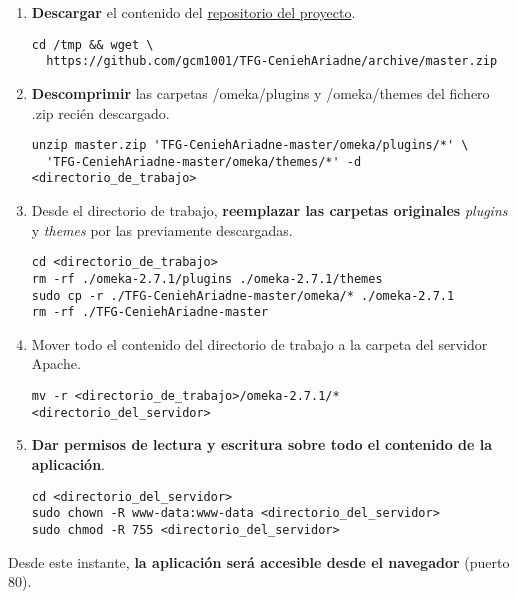 \begin{enumerate}
{  datos} (anotados en el paso 1).
\begin{verbatim}
cd <directorio_de_trabajo>/omeka-2.7.1
nano db.ini
\end{verbatim}
  No es necesario modificar los parámetros `prefix` o `port`.
\begin{verbatim}
[database]
host     = "localhost"
username = "usuario"
password = "contraseña"
dbname   = "omekadb"
prefix   = "omeka_"
charset  = "utf8"
;port     = ""
\end{verbatim}
\item
  \textbf{Descargar} el contenido del
  \href{https://github.com/gcm1001/TFG-CeniehAriadne}{repositorio del
  proyecto}.
\begin{verbatim}
cd /tmp && wget \
  https://github.com/gcm1001/TFG-CeniehAriadne/archive/master.zip
\end{verbatim}
\item
  \textbf{Descomprimir} las carpetas {/omeka/plugins} y {/omeka/themes}
  del fichero {.zip} recién descargado.
\begin{verbatim}
unzip master.zip 'TFG-CeniehAriadne-master/omeka/plugins/*' \
  'TFG-CeniehAriadne-master/omeka/themes/*' -d <directorio_de_trabajo>
\end{verbatim}
\item
  Desde el directorio de trabajo, \textbf{reemplazar las carpetas
  originales} \emph{plugins} y \emph{themes} por las previamente
  descargadas.
\begin{verbatim}
cd <directorio_de_trabajo>
rm -rf ./omeka-2.7.1/plugins ./omeka-2.7.1/themes
sudo cp -r ./TFG-CeniehAriadne-master/omeka/* ./omeka-2.7.1
rm -rf ./TFG-CeniehAriadne-master
\end{verbatim}
\item
  Mover todo el contenido del directorio de trabajo a la carpeta del
  servidor Apache.
\begin{verbatim}
mv -r <directorio_de_trabajo>/omeka-2.7.1/* <directorio_del_servidor>
\end{verbatim}
\item
  \textbf{Dar permisos de lectura y escritura sobre todo el contenido de
  la aplicación}.
\begin{verbatim}
cd <directorio_del_servidor>
sudo chown -R www-data:www-data <directorio_del_servidor>
sudo chmod -R 755 <directorio_del_servidor>
\end{verbatim}
\end{enumerate}

Desde este instante, \textbf{la aplicación será accesible desde el
navegador} (puerto 80).

